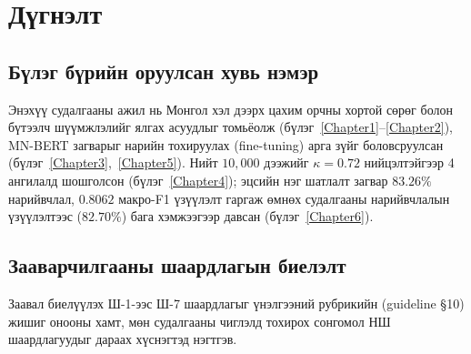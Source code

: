 ﻿%

\chapter{Дүгнэлт}
\label{Chapter8}

\section{Бүлэг бүрийн оруулсан хувь нэмэр}

Энэхүү судалгааны ажил нь Монгол хэл дээрх цахим орчны хортой сөрөг болон бүтээлч шүүмжлэлийг ялгах асуудлыг томьёолж (бүлэг~\ref{Chapter1}--\ref{Chapter2}), MN-BERT загварыг нарийн тохируулах (fine-tuning) арга зүйг боловсруулсан (бүлэг~\ref{Chapter3},~\ref{Chapter5}). Нийт $10{,}000$ дээжийг $\kappa{=}0.72$ нийцэлтэйгээр 4 ангилалд шошголсон (бүлэг~\ref{Chapter4}); эцсийн нэг шатлалт загвар $\mathbf{83.26\%}$ нарийвчлал, $\mathbf{0.8062}$ макро-F1 үзүүлэлт гаргаж өмнөх судалгааны нарийвчлалын үзүүлэлтээс ($82.70\%$) бага хэмжээгээр давсан (бүлэг~\ref{Chapter6}).

\section{Зааварчилгааны шаардлагын биелэлт}

Заавал биелүүлэх Ш-1-ээс Ш-7 шаардлагыг үнэлгээний рубрикийн (guideline §10)
жишиг онооны хамт, мөн судалгааны чиглэлд тохирох сонгомол НШ шаардлагуудыг
дараах хүснэгтэд нэгтгэв.

